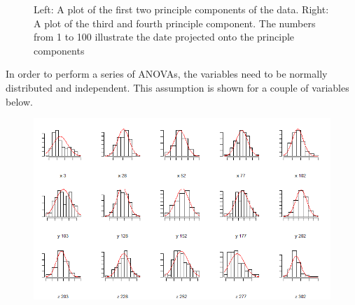 \documentclass[11pt, fleqn, titlepage]{article}
\begin{document}
\begin{figure}[H]
	\centering
	\qquad
	\caption{Left: A plot of the first two principle components of the data. Right: A plot of the third and fourth principle component. The numbers from 1 to 100 illustrate the date projected onto the principle components}%
	\label{fig:example}%
\end{figure}

\noindent In order to perform a series of ANOVAs, the variables need to be normally distributed and independent. This assumption is shown for a couple of variables below.

\begin{figure}[H]
	\centering
	\includegraphics[width=0.7\linewidth]{billeder/normalAF}
	\caption{}
	\label{fig:normalaf}
\end{figure}
\end{document}
